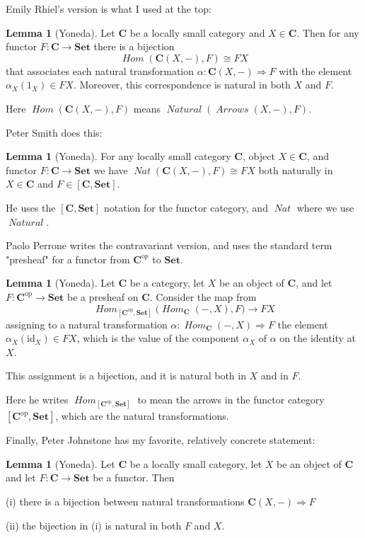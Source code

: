 \documentclass[12pt]{article}
\theoremstyle{definition}
\newtheorem{lemma}[thm]{Lemma}
\theoremstyle{definition}
\theoremstyle{definition}
\numberwithin{equation}{section}
\newcommand{\op}{\mathrm{op}}           %
\newcommand{\cat}[1]{\mathbf{#1}}      %
\newcommand{\fcat}[1]{{\mathbf {#1}}}    %
\newcommand{\id}{\mathrm{id}} %
\newcommand{\CC}{\cat{C}}
\newcommand{\CCop}{\cat{C}^{\mathrm op}}
\DeclareMathOperator{\Arrows}{\mathit{Arrows}}
\DeclareMathOperator{\Hom}{\mathit{Hom}}
\DeclareMathOperator{\Nat}{\mathit{Natural}}
\newcommand{\Set}{\fcat{Set}}           %
\newcommand{\iso}{\cong}                %
\newcommand{\fto}{\Rightarrow}
\def\pg{\bigskip\goodbreak
\ni}
\def\ni{\goodbreak\noindent}
\begin{document}
\pg
Emily Rhiel's \cite{Rhiel2016} version is what I used at the top:

\begin{lemma}[Yoneda]\label{yoneda-rhiel} Let $\CC$ be a locally small category and $X \in
\CC$. Then for any functor $F : \CC \to \Set$ there is a bijection
$$
\Hom(\CC(X,-), F) \iso FX
$$
that associates each natural transformation $\alpha:\CC(X,-) \fto F$ with the element
$\alpha_X(1_X) \in FX$. Moreover, this correspondence is natural in both $X$ and $F$.
\end{lemma}
\ni
Here $\Hom(\CC(X,-), F)$ means $\Nat(\Arrows(X,-), F)$.

\pg
Peter Smith \cite{Smith} does this:

\begin{lemma}[Yoneda]\label{yoneda-smith} For any locally small category $\CC$, object $X \in
\CC$, and functor $F:\CC \to \Set$ we have  $\mathop{\mathit{Nat}}(\CC(X,-),F) \iso FX$ both naturally in
$X \in \CC$ and $F \in [\CC, \Set]$.
\end{lemma}
\ni
He uses the $[\CC, \Set]$ notation for the functor category, and $\mathop{\mathit{Nat}}$ where we use $\Nat$.

\pg
Paolo Perrone \cite{Perrone} writes the contravariant version, and uses the standard term "presheaf" 
for a functor from $\CCop$ to $\Set$.

\begin{lemma}[Yoneda]\label{yoneda-perrone} Let $\cat{C}$ be a category, let $X$ be an object of
 $\cat{C}$, and let $F:\cat{C}^\op\to\Set$ be a presheaf on $\cat{C}$. Consider the map
 from
 $$
 \Hom_{[\cat{C}^\op,\Set]} \bigl(\Hom_\cat{C} (-,X) , F \bigr) \to FX
 $$
 assigning to a natural transformation $\alpha:\Hom_\cat{C} (-,X)\fto F$ the element
 $\alpha_X(\id_X)\in FX$, which is the value of the component $\alpha_X$ of $\alpha$ on
 the identity at $X$. 

This assignment is a bijection, and it is natural both in $X$ and in $F$.
\end{lemma}
\ni
Here he writes $\Hom_{[\cat{C}^\op,\Set]}$ to mean the arrows in the functor category $[\cat{C}^\op,\Set]$,
which are the natural transformations.

\bigskip
\noindent
Finally, Peter Johnstone \cite{Johnstone} has my favorite, relatively concrete statement:

\begin{lemma}[Yoneda]\label{yoneda-johnstone} Let $\CC$ be a locally small category, let $X$ be an object of $\CC$
and let $F:\CC \to \Set$ be a functor. Then

(i)  there is a bijection between natural transformations $\CC(X, -) \fto F$

(ii) the bijection in (i) is natural in both $F$ and $X$.
\end{lemma}
\end{document}
